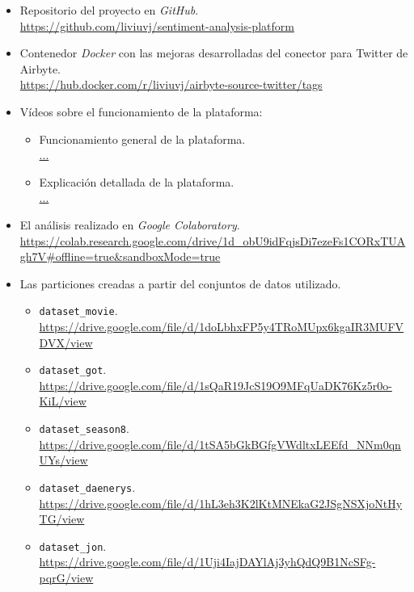 \begin{itemize}
    \item Repositorio del proyecto en \textit{GitHub}.\\
        \url{https://github.com/liviuvj/sentiment-analysis-platform}
    
    \item Contenedor \textit{Docker} con las mejoras desarrolladas del conector para Twitter de  Airbyte.\\
        \url{https://hub.docker.com/r/liviuvj/airbyte-source-twitter/tags}

    \item Vídeos sobre el funcionamiento de la plataforma:
    \begin{itemize}
        \item Funcionamiento general de la plataforma.\\
            \url{...}
        \item Explicación detallada de la plataforma.\\
            \url{...}
    \end{itemize}

    \item El análisis realizado en \textit{Google Colaboratory}.\\
        \url{https://colab.research.google.com/drive/1d_obU9idFqjsDi7ezeFs1CORxTUAgh7V#offline=true&sandboxMode=true}

    \item Las particiones creadas a partir del conjuntos de datos utilizado.
    \begin{itemize}
        \item \texttt{dataset\_movie}.\\
            \url{https://drive.google.com/file/d/1doLbhxFP5y4TRoMUpx6kgaIR3MUFVDVX/view}
        \item \texttt{dataset\_got}.\\
            \url{https://drive.google.com/file/d/1sQaR19JcS19O9MFqUaDK76Kz5r0o-KiL/view}
        \item \texttt{dataset\_season8}.\\
            \url{https://drive.google.com/file/d/1tSA5bGkBGfgVWdltxLEEfd_NNm0qnUYs/view}
        \item \texttt{dataset\_daenerys}.\\
            \url{https://drive.google.com/file/d/1hL3eh3K2lKtMNEkaG2JSgNSXjoNtHyTG/view}
        \item \texttt{dataset\_jon}.\\
            \url{https://drive.google.com/file/d/1Uji4IajDAYlAj3yhQdQ9B1NcSFg-pqrG/view}
    \end{itemize}
    
\end{itemize}

